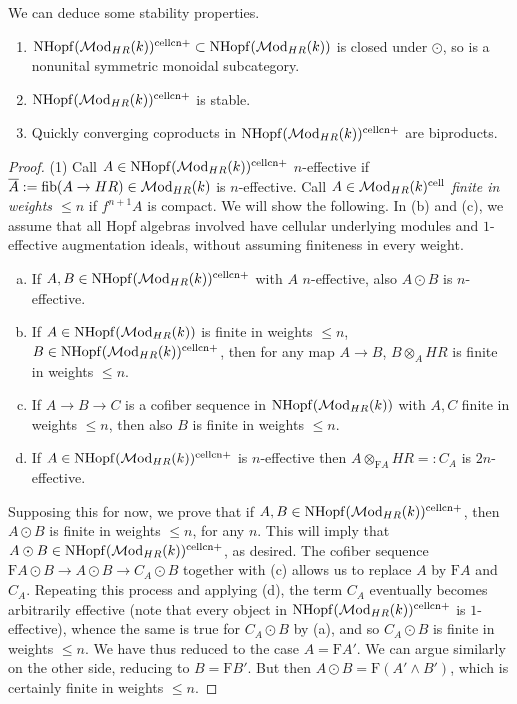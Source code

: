 \documentclass{amsart}
\numberwithin{proposition}{section}
\numberwithin{equation}{section}
\def\cell{\mathrm{cell}}
\def\NHopf{\mathrm{NHopf}}
\def\cn{\mathrm{cn}}
\def\Free{\mathrm{F}}
\def\hotimes{\odot}
\begin{document}
We can deduce some stability properties.
\begin{proposition} \label{prop:NHopf-stability}
\begin{enumerate}
\item $\NHopf(\Mod_{HR}(k))^{\cell\cn+} \subset \NHopf(\Mod_{HR}(k))$ is closed under $\hotimes$, so is a nonunital symmetric monoidal subcategory.
\item $\NHopf(\Mod_{HR}(k))^{\cell\cn+}$ is stable.
\item Quickly converging coproducts in $\NHopf(\Mod_{HR}(k))^{\cell\cn+}$ are biproducts.
\end{enumerate}
\end{proposition}
\begin{proof}
(1) Call $A \in \NHopf(\Mod_{HR}(k))^{\cell\cn+}$ $n$-effective if $\overline{A} := \mathrm{fib}(A \to HR) \in \mathcal{M}\mathrm{od}_{HR}(k)$ is $n$-effective.
Call $A \in \Mod_{HR}(k)^{\cell}$ \emph{finite in weights $\le n$} if $f^{n+1} A$ is compact.
We will show the following.
In (b) and (c), we assume that all Hopf algebras involved have cellular underlying modules and $1$-effective augmentation ideals, without assuming finiteness in every weight.
\begin{enumerate}[(a)]
\item If $A, B \in \NHopf(\Mod_{HR}(k))^{\cell\cn+}$ with $A$ $n$-effective, also $A \hotimes B$ is $n$-effective.
\item If $A \in \NHopf(\Mod_{HR}(k))$ is finite in weights $\le n$, $B \in \NHopf(\Mod_{HR}(k))^{\cell\cn+}$, then for any map $A \to B$, $B \otimes_A HR$ is finite in weights $\le n$.
\item If $A \to B \to C$ is a cofiber sequence in $\NHopf(\Mod_{HR}(k))$ with $A, C$ finite in weights $\le n$, then also $B$ is finite in weights $\le n$.
\item If $A \in \NHopf(\Mod_{HR}(k))^{\cell\cn+}$ is $n$-effective then $A \otimes_{\Free A} HR =: C_A$ is $2n$-effective.
\end{enumerate}

Supposing this for now, we prove that if $A, B \in \NHopf(\Mod_{HR}(k))^{\cell\cn+}$, then $A \hotimes B$ is finite in weights $\le n$, for any $n$.
This will imply that $A \hotimes B \in \NHopf(\Mod_{HR}(k))^{\cell\cn+}$, as desired.
The cofiber sequence $\Free A \hotimes B \to A \hotimes B \to C_A \hotimes B$ together with (c) allows us to replace $A$ by $\Free A$ and $C_A$.
Repeating this process and applying (d), the term $C_A$ eventually becomes arbitrarily effective (note that every object in $\NHopf(\Mod_{HR}(k))^{\cell\cn+}$ is $1$-effective), whence the same is true for $C_A \hotimes B$ by (a), and so $C_A \hotimes B$ is finite in weights $\le n$.
We have thus reduced to the case $A = \Free A'$.
We can argue similarly on the other side, reducing to $B = \Free B'$.
But then $A \hotimes B = \Free(A' \wedge B')$, which is certainly finite in weights $\le n$.


\end{proof}
\end{document}
